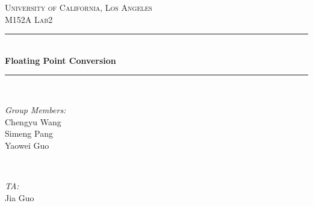 \begin{titlepage}

\newcommand{\HRule}{\rule{\linewidth}{0.5mm}} %

\center %
 

\textsc{\LARGE University of California, Los Angeles}\\[1.5cm] %
\textsc{\Large M152A Lab2}\\[0.5cm] %
 


\HRule \\[0.4cm]
{ \huge \bfseries Floating Point Conversion}\\[0.4cm] %
\HRule \\[1.5cm]
 

\begin{minipage}{0.4\textwidth}
\begin{flushleft} \large
\emph{Group Members:}\\
Chengyu Wang\\
Simeng Pang\\
Yaowei Guo%
\end{flushleft}
\end{minipage}
~
\begin{minipage}{0.4\textwidth}
\begin{flushright} \large
\emph{TA:} \\
Jia Guo %
\end{flushright}
\end{minipage}\\[4cm]



\end{titlepage}
